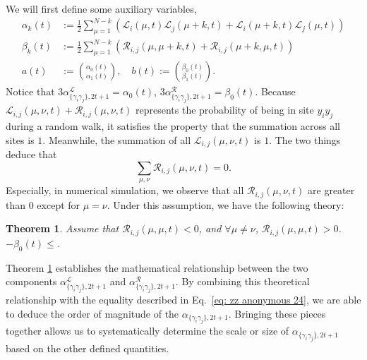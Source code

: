\documentclass{article}
\newtheorem{theorem}{Theorem}
\newcommand{\alpl}{\alpha_{\{\gamma_i\gamma_j\}, 2t+1}^{\mathscr{L}}}
\newcommand{\alpr}{\alpha_{\{\gamma_i\gamma_j\}, 2t+1}^{\mathscr{R}}}
\begin{document}
We will first define some auxiliary variables, 
\begin{align*}
\alpha_k(t) & :=\frac{1}{2} \sum_{\mu=1}^{N-k}\left(\mathcal{L}_i(\mu, t) \mathcal{L}_j(\mu+k, t)+\mathcal{L}_i(\mu+k, t) \mathcal{L}_j(\mu, t)\right) \\
\beta_k(t) & :=\frac{1}{2} \sum_{\mu=1}^{N-k}\left(\mathscr{R}_{i, j}(\mu, \mu+k, t)+\mathscr{R}_{i, j}(\mu+k, \mu, t)\right) \\
a(t) & :=\binom{\alpha_0(t)}{\alpha_1(t)}, \quad b(t):=\binom{\beta_0(t)}{\beta_1(t)}.
\end{align*}
Notice that $3\alpl = \alpha_0(t)$, $3\alpr = \beta_0(t)$. Because $\mathscr{L}_{i, j}(\mu, \nu, t) + \mathscr{R}_{i, j}(\mu, \nu, t)$ represents the probability of being in site $y_iy_j$ during a random walk, it satisfies the property that the summation across all sites is $1$. Meanwhile, the summation of all $\mathscr{L}_{i, j}(\mu, \nu, t)$ is $1$. The two things deduce that
\begin{equation}
    \sum_{\mu, \nu} \mathscr{R}_{i, j}(\mu, \nu, t) =0.
\end{equation}
Especially, in numerical simulation, we observe that all $\mathscr{R}_{i, j}(\mu, \nu, t)$ are greater than $0$ except for $\mu=\nu$. Under this assumption, we have the following theory:
\begin{theorem}
\label{theorem: relation between alpha L and alpha R}
    Assume that $\mathscr{R}_{i, j}(\mu, \mu, t)<0$, and $\forall \mu \neq \nu$, $\mathscr{R}_{i, j}(\mu, \mu, t)>0$. $-\beta_0(t) \leq $.
\end{theorem}
Theorem \ref{theorem: relation between alpha L and alpha R} establishes the mathematical relationship between the two components $\alpl$ and $\alpr$. By combining this theoretical relationship with the equality described in Eq.~\eqref{eq: zz anonymous 24}, we are able to deduce the order of magnitude of the $\alpha_{\{\gamma_i\gamma_j\}, 2t+1}$. Bringing these pieces together allows us to systematically determine the scale or size of $\alpha_{\{\gamma_i\gamma_j\}, 2t+1}$ based on the other defined quantities. 
\end{document}
